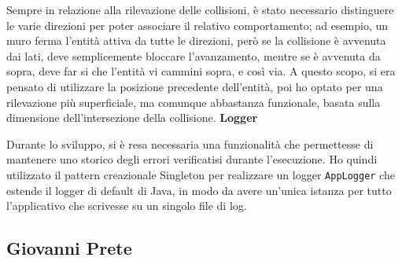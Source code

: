 \documentclass[a4paper,12pt]{report}
\begin{document}
Sempre in relazione alla rilevazione delle collisioni, è stato necessario distinguere le varie direzioni per poter associare il relativo comportamento; ad esempio, un muro ferma l'entità attiva da tutte le direzioni, però se la collisione è avvenuta dai lati, deve semplicemente bloccare l'avanzamento, mentre se è avvenuta da sopra, deve far si che l'entità vi cammini sopra, e così via.
A questo scopo, si era pensato di utilizzare la posizione precedente dell'entità, poi ho optato per una rilevazione più superficiale, ma comunque abbastanza funzionale, basata sulla dimensione dell'intersezione della collisione.
\newline
\newline
\textbf{Logger}

Durante lo sviluppo, si è resa necessaria una funzionalità che permettesse di mantenere uno storico degli errori verificatisi durante l'esecuzione. Ho quindi utilizzato il pattern creazionale Singleton per realizzare un logger \texttt{AppLogger} che estende il logger di default di Java, in modo da avere un'unica istanza per tutto l'applicativo che scrivesse su un singolo file di log.
\subsection{Giovanni Prete}
\end{document}
